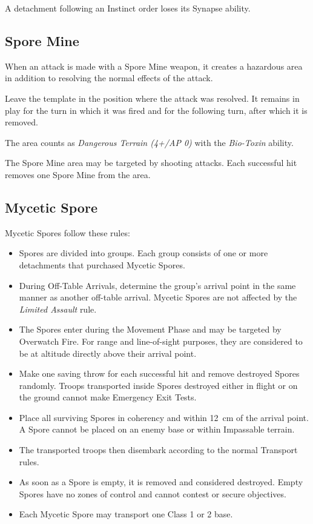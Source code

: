 A detachment following an Instinct order loses its Synapse ability.

\subsection{Spore Mine}

When an attack is made with a Spore Mine weapon, it creates a hazardous area in addition to resolving the normal effects of the attack.

Leave the template in the position where the attack was resolved. It remains in play for the turn in which it was fired and for the following turn, after which it is removed.

The area counts as \textit{Dangerous Terrain (4+/AP 0)} with the \textit{Bio-Toxin} ability.

The Spore Mine area may be targeted by shooting attacks. Each successful hit removes one Spore Mine from the area.

\subsection{Mycetic Spore}

Mycetic Spores follow these rules:

\begin{itemize}
    \item Spores are divided into groups. Each group consists of one or more detachments that purchased Mycetic Spores.

    \item During Off-Table Arrivals, determine the group's arrival point in the same manner as another off-table arrival. Mycetic Spores are not affected by the \textit{Limited Assault} rule.

    \item The Spores enter during the Movement Phase and may be targeted by Overwatch Fire. For range and line-of-sight purposes, they are considered to be at altitude directly above their arrival point.

    \item Make one saving throw for each successful hit and remove destroyed Spores randomly. Troops transported inside Spores destroyed either in flight or on the ground cannot make Emergency Exit Tests.

    \item Place all surviving Spores in coherency and within 12~cm of the arrival point. A Spore cannot be placed on an enemy base or within Impassable terrain.

    \item The transported troops then disembark according to the normal Transport rules.

    \item As soon as a Spore is empty, it is removed and considered destroyed. Empty Spores have no zones of control and cannot contest or secure objectives.

    \item Each Mycetic Spore may transport one Class 1 or 2 base.
\end{itemize}

